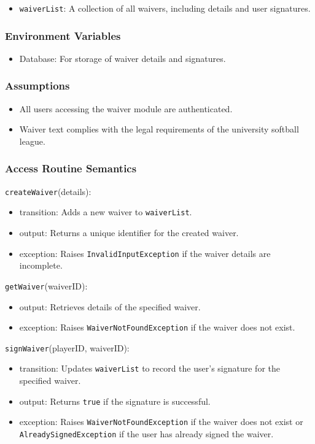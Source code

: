 \documentclass[12pt, titlepage]{article}
\begin{document}
\begin{itemize}
    \item \texttt{waiverList}: A collection of all waivers, including details and user signatures.
\end{itemize}

\subsubsection{Environment Variables}
\begin{itemize}
    \item Database: For storage of waiver details and signatures.
\end{itemize}

\subsubsection{Assumptions}
\begin{itemize}
    \item All users accessing the waiver module are authenticated.
    \item Waiver text complies with the legal requirements of the university softball league.
\end{itemize}

\subsubsection{Access Routine Semantics}

\noindent \texttt{createWaiver}(details):  
\begin{itemize}
    \item transition: Adds a new waiver to \texttt{waiverList}.
    \item output: Returns a unique identifier for the created waiver.
    \item exception: Raises \texttt{InvalidInputException} if the waiver details are incomplete.
\end{itemize}

\noindent \texttt{getWaiver}(waiverID):  
\begin{itemize}
    \item output: Retrieves details of the specified waiver.
    \item exception: Raises \texttt{WaiverNotFoundException} if the waiver does not exist.
\end{itemize}

\noindent \texttt{signWaiver}(playerID, waiverID):  
\begin{itemize}
    \item transition: Updates \texttt{waiverList} to record the user's signature for the specified waiver.
    \item output: Returns \texttt{true} if the signature is successful.
    \item exception: Raises \texttt{WaiverNotFoundException} if the waiver does not exist or \texttt{AlreadySignedException} if the user has already signed the waiver.
\end{itemize}
\end{document}
